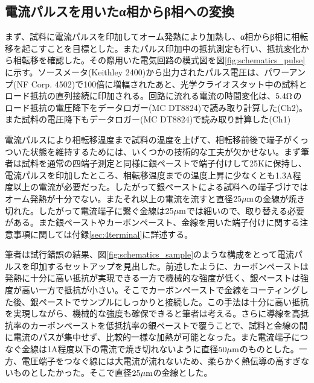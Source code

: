 \subsection{電流パルスを用いたα相からβ相への変換}
まず、試料に電流パルスを印加してオーム発熱により加熱し、α相からβ相に相転移を起こすことを目標とした。またパルス印加中の抵抗測定も行い、抵抗変化から相転移を確認した。その際用いた電気回路の模式図を図\ref{fig:schematics_pulse}に示す。ソースメータ(Keithley 2400)から出力されたパルス電圧は、パワーアンプ(NF Corp. 4502)で100倍に増幅されたあと、光学クライオスタット中の試料とロード抵抗の直列接続に印加される。回路に流れる電流の時間変化は、$\rm 5.4\Omega$のロード抵抗の電圧降下をデータロガー(MC DT8824)で読み取り計算した(Ch2)。また試料の電圧降下もデータロガー(MC DT8824)で読み取り計算した(Ch1)

電流パルスにより相転移温度まで試料の温度を上げて、相転移前後で端子がくっついた状態を維持するためには、いくつかの技術的な工夫が欠かせない。まず筆者は試料を通常の四端子測定と同様に銀ペーストで端子付けして25Kに保持し、電流パルスを印加したところ、相転移温度までの温度上昇に少なくとも1.3A程度以上の電流が必要だった。したがって銀ペーストによる試料への端子づけではオーム発熱が十分でない。またそれ以上の電流を流すと直径$\rm 25 \mu m$の金線が焼き切れた。したがって電流端子に繋ぐ金線は$\rm 25 \mu m$では細いので、取り替える必要がある。また銀ペーストやカーボンペースト、金線を用いた端子付けに関する注意事項に関しては付録\ref{sec:4terminal}に詳述する。

筆者は試行錯誤の結果、図\ref{fig:schematics_sample}のような構成をとって電流パルスを印加するセットアップを見出した。前述したように、カーボンペーストは発熱に十分に高い抵抗が実現できる一方で機械的な強度が低く、銀ペーストは強度が高い一方で抵抗が小さい。そこでカーボンペーストで金線をコーティングした後、銀ペーストでサンプルにしっかりと接続した。この手法は十分に高い抵抗を実現しながら、機械的な強度も確保できると筆者は考える。さらに導線を高抵抗率のカーボンペーストを低抵抗率の銀ペーストで覆うことで、試料と金線の間に電流のパスが集中せず、比較的一様な加熱が可能となった。また電流端子につなぐ金線は1A程度以下の電流で焼き切れないように直径$\rm 50 \mu m$のものとした。一方、電圧端子をつなぐ線には大電流が流れないため、柔らかく熱伝導の高すぎないものとしたかった。そこで直径$\rm 25 \mu m$の金線とした。

